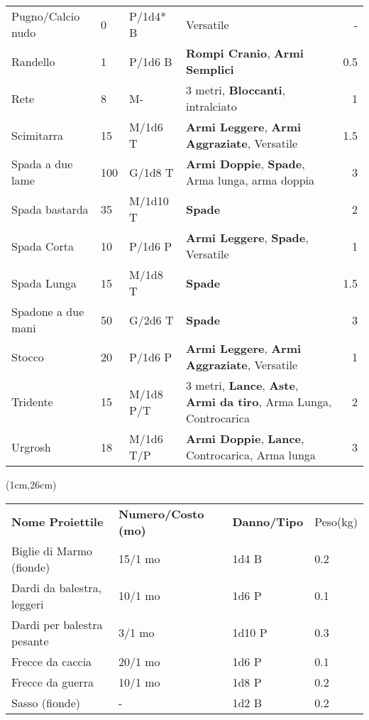 \documentclass[a4paper,12 pt,openany]{book}
\begin{document}
\begin{textblock*}{19cm}
\begin{xltabular}{1\textwidth}{lllXr}
			Pugno/Calcio nudo& 0& P/1d4* B&Versatile& -\\
			Randello& 1& P/1d6 B&\textbf{Rompi Cranio}, \textbf{Armi Semplici}& 0.5\\
			Rete& 8& M-&3 metri, \textbf{Bloccanti}, intralciato& 1\\
			Scimitarra& 15 & M/1d6 T&\textbf{Armi Leggere}, \textbf{Armi Aggraziate}, Versatile& 1.5\\
			Spada a due lame& 100& G/1d8 T& \textbf{Armi Doppie}, \textbf{Spade}, Arma lunga, arma doppia& 3\\
			Spada bastarda& 35 & M/1d10 T&\textbf{Spade}& 2\\
			Spada Corta& 10 & P/1d6 P&\textbf{Armi Leggere}, \textbf{Spade}, Versatile& 1\\
			Spada Lunga& 15 & M/1d8 T&\textbf{Spade}& 1.5\\
			Spadone a due mani& 50 & G/2d6 T&\textbf{Spade}& 3\\
			Stocco& 20 & P/1d6 P& \textbf{Armi Leggere}, \textbf{Armi Aggraziate}, Versatile& 1\\
			Tridente& 15 & M/1d8 P/T& 3 metri, \textbf{Lance}, \textbf{Aste}, \textbf{Armi da tiro}, Arma Lunga, Controcarica& 2\\
			Urgrosh& 18 & M/1d6 T/P& \textbf{Armi Doppie}, \textbf{Lance}, Controcarica, Arma lunga & 3\\
		\end{xltabular}
		
	\end{textblock*}
	
	\begin{textblock*}{13cm}(1cm,26cm) %
		
		\footnotesize 	
		
		\begin{tabular}{llll}	
			
			\textbf{Nome Proiettile}   & \textbf{Numero/Costo (mo)} & \textbf{Danno/Tipo} & Peso(kg) \\
			Biglie di Marmo (fionde)   & 15/1 mo                    & 1d4 B               & 0.2      \\
			Dardi da balestra, leggeri & 10/1 mo                    & 1d6 P               & 0.1      \\
			Dardi per balestra pesante & 3/1 mo                     & 1d10 P              & 0.3      \\
			Frecce da caccia           & 20/1 mo                    & 1d6 P               & 0.1      \\
			Frecce da guerra           & 10/1 mo                    & 1d8 P               & 0.2      \\
			Sasso (fionde)             & -                          & 1d2 B               & 0.2      \\
		\end{tabular}
		
	\end{textblock*}
	
\end{document}
